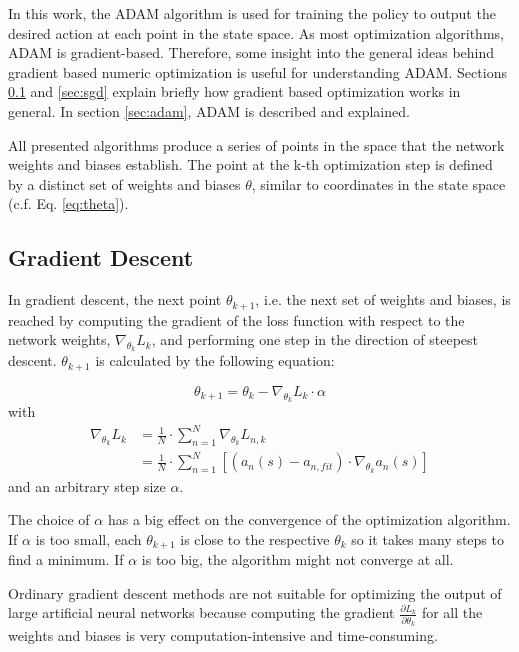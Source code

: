 In this work, the ADAM algorithm is used for training the policy to output the desired action at each point in the state space. As most optimization algorithms, ADAM is gradient-based. Therefore, some insight into the general ideas behind gradient based numeric optimization is useful for understanding ADAM. Sections \ref{sec:grad_desc} and \ref{sec:sgd} explain briefly how gradient based optimization works in general. In section \ref{sec:adam}, ADAM is described and explained.

All presented algorithms produce a series of points in the space that the network weights and biases establish. The point at the k-th optimization step is defined by a distinct set of weights and biases $\theta$, similar to coordinates in the state space (c.f. Eq. \ref{eq:theta}).

\subsection{Gradient Descent}
\label{sec:grad_desc}

In gradient descent, the next point $\theta_{k+1}$, i.e. the next set of weights and biases, is reached by computing the gradient of the loss function with respect to the network weights, $\nabla_{\theta_k}L_k$, and performing one step in the direction of steepest descent. $\theta_{k+1}$ is calculated by the following equation:

\begin{equation}
\theta_{k+1} = \theta_k - \nabla_{\theta_k}L_k\cdot \alpha
\label{eq:gd_update}
\end{equation}
with
\begin{align}
\nabla_{\theta_k}L_k &=\frac{1}{N}\cdot\sum_{n=1}^{N}\nabla_{\theta_k}L_{n,k} \\
&=\frac{1}{N}\cdot\sum_{n=1}^{N}[(a_n(s)-a_{n,fit})\cdot\nabla_{\theta_k}a_n(s)]
\end{align}
and an arbitrary step size $\alpha$.

The choice of $\alpha$ has a big effect on the convergence of the optimization algorithm. If $\alpha$ is too small, each $\theta_{k+1}$ is close to the respective $\theta_{k}$ so it takes many steps to find a minimum. If $\alpha$ is too big, the algorithm might not converge at all.

Ordinary gradient descent methods are not suitable for optimizing the output of large artificial neural networks because computing the gradient $\frac{\partial L_k}{\partial \theta_k}$ for all the weights and biases is very computation-intensive and time-consuming.


